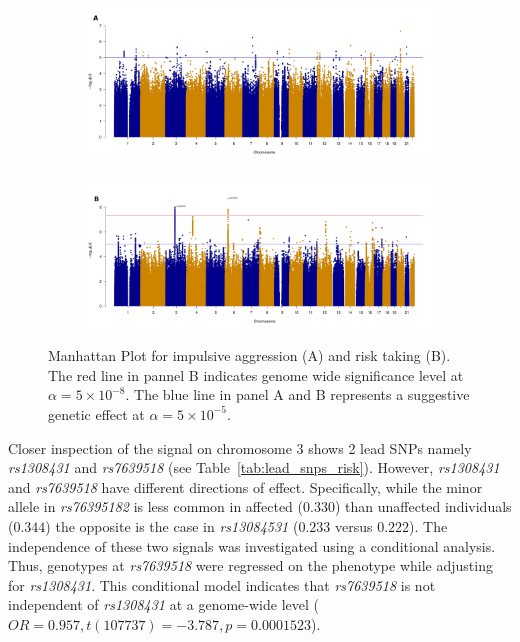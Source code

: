 \begin{figure}[!htpb]
  \begin{subfigure}{1\textwidth}
  \centering
  \includegraphics[width=0.8\linewidth]{ukb_assoc/figure/manhatten_plots/agg_manhatten_color_2_A.jpeg}
  \end{subfigure}
  \begin{subfigure}{1\textwidth}
  \centering
  \includegraphics[width=0.8\linewidth]{ukb_assoc/figure/manhatten_plots/risk_manhatten_color_B.jpeg}
  \end{subfigure}
  \caption[Manhatten Plots]{
    Manhattan Plot for impulsive aggression (A)
    and risk taking (B).
    The red line in pannel B indicates genome wide significance level at $\alpha=5\times10^{-8}$.
    The blue line in panel A and B represents a suggestive genetic effect at $\alpha=5\times10^{-5}$.}\label{fig:manhatten}
\end{figure}

Closer inspection of the signal on chromosome 3 shows 2 lead SNPs namely \textit{rs1308431} and \textit{rs7639518} (see Table~\ref{tab:lead_snps_risk}).
However, \textit{rs1308431} and \textit{rs7639518} have different directions of effect.
Specifically, while the minor allele in \textit{rs76395182} is less common in affected ($0.330$) than unaffected individuals ($0.344$) the opposite is the case in \textit{rs13084531} ($0.233$ versus $0.222$).
The independence of these two signals was investigated using a conditional analysis.
Thus, genotypes at \textit{rs7639518} were regressed on the phenotype while adjusting for \textit{rs1308431}.
This conditional model indicates that \textit{rs7639518} is not independent of \textit{rs1308431} at a genome-wide level ($OR=0.957, t(107737)=-3.787, p=0.0001523$).

